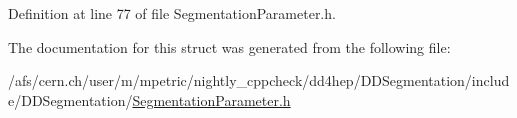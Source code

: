 Definition at line 77 of file SegmentationParameter.h.

The documentation for this struct was generated from the following file:\begin{DoxyCompactItemize}
\item 
/afs/cern.ch/user/m/mpetric/nightly\_\-cppcheck/dd4hep/DDSegmentation/include/DDSegmentation/\hyperlink{_segmentation_parameter_8h}{SegmentationParameter.h}\end{DoxyCompactItemize}
